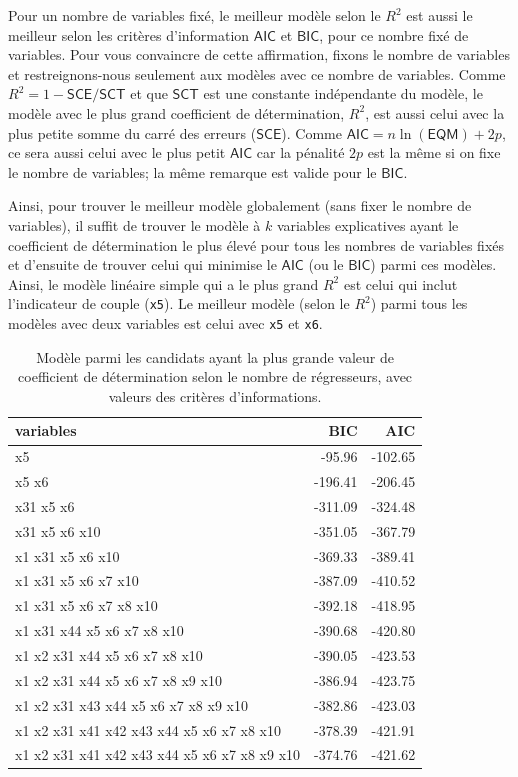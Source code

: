 \documentclass[
  11pt,
  letterpaper,
]{scrbook}
\theoremstyle{definition}
\theoremstyle{remark}
\begin{document}
Pour un nombre de variables fixé, le meilleur modèle selon le \(R^2\)
est aussi le meilleur selon les critères d'information \(\mathsf{AIC}\)
et \(\mathsf{BIC}\), pour ce nombre fixé de variables. Pour vous
convaincre de cette affirmation, fixons le nombre de variables et
restreignons-nous seulement aux modèles avec ce nombre de variables.
Comme \(R^2=1 - \mathsf{SCE}/\mathsf{SCT}\) et que \(\mathsf{SCT}\) est
une constante indépendante du modèle, le modèle avec le plus grand
coefficient de détermination, \(R^2\), est aussi celui avec la plus
petite somme du carré des erreurs (\(\mathsf{SCE}\)). Comme
\(\mathsf{AIC}=n \ln (\mathsf{EQM}) + 2p\), ce sera aussi celui avec le
plus petit \(\mathsf{AIC}\) car la pénalité \(2p\) est la même si on
fixe le nombre de variables; la même remarque est valide pour le
\(\mathsf{BIC}\).

Ainsi, pour trouver le meilleur modèle globalement (sans fixer le nombre
de variables), il suffit de trouver le modèle à \(k\) variables
explicatives ayant le coefficient de détermination le plus élevé pour
tous les nombres de variables fixés et d'ensuite de trouver celui qui
minimise le \(\mathsf{AIC}\) (ou le \(\mathsf{BIC}\)) parmi ces modèles.
Ainsi, le modèle linéaire simple qui a le plus grand \(R^2\) est celui
qui inclut l'indicateur de couple (\texttt{x5}). Le meilleur modèle
(selon le \(R^2\)) parmi tous les modèles avec deux variables est celui
avec \texttt{x5} et \texttt{x6}.

\hypertarget{tbl-leaps-simple}{}
\begin{table}
\caption{\label{tbl-leaps-simple}Modèle parmi les candidats ayant la plus grande valeur de coefficient de
détermination selon le nombre de régresseurs, avec valeurs des critères
d'informations. }\tabularnewline

\centering
\begin{tabular}{lrr}
\toprule
variables & BIC & AIC\\
\midrule
x5 & -95.96 & -102.65\\
x5 x6 & -196.41 & -206.45\\
x31 x5 x6 & -311.09 & -324.48\\
x31 x5 x6 x10 & -351.05 & -367.79\\
x1 x31 x5 x6 x10 & -369.33 & -389.41\\
\addlinespace
x1 x31 x5 x6 x7 x10 & -387.09 & -410.52\\
x1 x31 x5 x6 x7 x8 x10 & -392.18 & -418.95\\
x1 x31 x44 x5 x6 x7 x8 x10 & -390.68 & -420.80\\
x1 x2 x31 x44 x5 x6 x7 x8 x10 & -390.05 & -423.53\\
x1 x2 x31 x44 x5 x6 x7 x8 x9 x10 & -386.94 & -423.75\\
\addlinespace
x1 x2 x31 x43 x44 x5 x6 x7 x8 x9 x10 & -382.86 & -423.03\\
x1 x2 x31 x41 x42 x43 x44 x5 x6 x7 x8 x10 & -378.39 & -421.91\\
x1 x2 x31 x41 x42 x43 x44 x5 x6 x7 x8 x9 x10 & -374.76 & -421.62\\
\bottomrule
\end{tabular}
\end{table}
\end{document}
